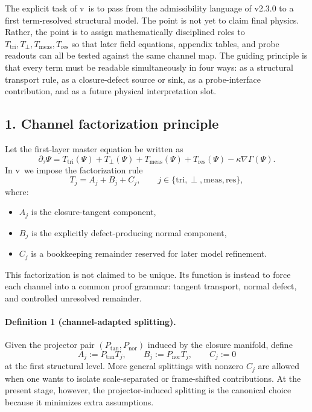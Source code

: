 The explicit task of v\docversion\ is to pass from the admissibility language of
v2.3.0 to a first term-resolved structural model. The point is not yet to claim
final physics. Rather, the point is to assign mathematically disciplined roles to
\(T_{\mathrm{tri}},T_{\perp},T_{\mathrm{meas}},T_{\mathrm{res}}\) so that later field equations,
appendix tables, and probe readouts can all be tested against the same channel map.
The guiding principle is that every term must be readable simultaneously in four
ways: as a structural transport rule, as a closure-defect source or sink, as a
probe-interface contribution, and as a future physical interpretation slot.

\subsection*{1. Channel factorization principle}
Let the first-layer master equation be written as
\[
\partial_\tau \Psi
= T_{\mathrm{tri}}(\Psi)
+ T_{\perp}(\Psi)
+ T_{\mathrm{meas}}(\Psi)
+ T_{\mathrm{res}}(\Psi)
- \kappa \nabla\Gamma(\Psi).
\]
In v\docversion\ we impose the factorization rule
\[
T_j = A_j + B_j + C_j,
\qquad j\in\{\mathrm{tri},\perp,\mathrm{meas},\mathrm{res}\},
\]
where:
\begin{itemize}
    \item $A_j$ is the closure-tangent component,
    \item $B_j$ is the explicitly defect-producing normal component,
    \item $C_j$ is a bookkeeping remainder reserved for later model refinement.
\end{itemize}
This factorization is not claimed to be unique. Its function is instead to force
each channel into a common proof grammar: tangent transport, normal defect, and
controlled unresolved remainder.

\paragraph{Definition 1 (channel-adapted splitting).}
Given the projector pair $(P_{\mathrm{tan}},P_{\mathrm{nor}})$ induced by the closure
manifold, define
\[
A_j:=P_{\mathrm{tan}}T_j,
\qquad
B_j:=P_{\mathrm{nor}}T_j,
\qquad
C_j:=0
\]
at the first structural level. More general splittings with nonzero $C_j$ are
allowed when one wants to isolate scale-separated or frame-shifted contributions.
At the present stage, however, the projector-induced splitting is the canonical
choice because it minimizes extra assumptions.

